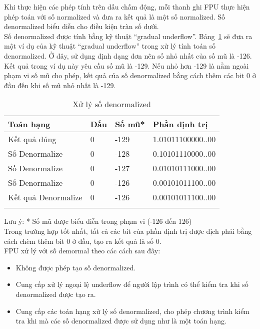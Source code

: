 	\newpage
	Khi thực hiện các phép tính trên dấu chấm động, mỗi thanh ghi FPU thực hiện phép toán với số normalized và đưa ra kết quả là một số normalized. Số denormalized biểu diễn cho điều kiện tràn số dưới.\\
	
	Số denormalized được tính bằng kỹ thuật “gradual underflow”. Bảng~\ref{tb:XuLySoDenormal} sẽ đưa ra một ví dụ của kỹ thuật “gradual underflow” trong xử lý tính toán số denormalized. Ở đây, sử dụng định dạng đơn nên số nhỏ nhất của số mũ là -126. Kết quả trong ví dụ này yêu cầu số mũ là -129. Nếu nhỏ hơn -129 là nằm ngoài phạm vi số mũ cho phép, kết quả của số denormalized bằng cách thêm các bit 0 ở đầu đến khi số mũ nhỏ nhất là -129.\\
		
		\begin{longtable}{ | m{4cm} | m{2cm} |  m{2cm} | m{4cm} | }
			\hline
				Toán hạng & Dấu & Số mũ* & Phần định trị\\
			\hline
			\hline
				Kết quả đúng & 0 & -129 & 1.01011100000..00\\
			\hline
				Số Denormalize & 0 & -128 & 0.10101110000..00\\
			\hline
				Số Denormalize & 0 & -127 & 0.01010111000..00\\
			\hline
				Số Denormalize & 0 & -126 & 0.00101011100..00\\
			\hline
				Kết quả Denormalize & 0 & -126 & 0.00101011100..00\\
			\hline
			\caption{Xử lý số denormalized}
				\label{tb:XuLySoDenormal}
		\end{longtable}
		
	
	Lưu ý: * Số mũ được biểu diễn trong phạm vi (-126 đến 126)\\

	Trong trường hợp tốt nhất, tất cả các bit của phần định trị được dịch phải bằng cách chèm thêm bit 0 ở đầu, tạo ra kết quả là số 0.\\

FPU xử lý với số demormal theo các cách sau đây: 
	\begin{itemize}
			\renewcommand{\labelitemi}{\textbullet}	
			\item	Không được phép tạo số denormalized.
			\item	Cung cấp xử lý ngoại lệ underflow để người lập trình có thể kiểm tra khi số denormalized được tạo ra.
			\item	Cung cấp các toán hạng xử lý số denormalized, cho phép chương trình kiểm tra khi mà các số denormalized được sử dụng như là một toán hạng. 
	\end{itemize}

